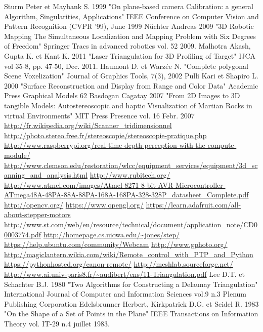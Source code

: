 \documentclass[a4paper,10pt]{report}
\begin{document}
\begin{thebibliography}{1}
 Sturm Peter et Maybank S. 1999 "On plane-based camera Calibration: a general Algorithm, Singularities, Applications" IEEE Conference on Computer Vision and Pattern Recognition (CVPR '99), June 1999
 Nüchter Andreas 2009 "3D Robotic Mapping The Simultaneous Localization and Mapping Problem with Six Degrees of Freedom" Springer Tracs in advanced robotics vol. 52 2009.
 Malhotra Akash, Gupta K. et Kant K. 2011 "Laser Triangulation for 3D Profiling of Target" IJCA vol 35-8, pp. 47-50, Dec. 2011.
 Haumont D. et Warzée N. "Complete polygonal Scene Voxelization" Journal of Graphics Tools, 7(3), 2002
 Pulli Kari et Shapiro L. 2000 "Surface Reconstruction and Display from Range and Color Data" Academic Press Graphical Models 62
 Basdogan Cagatay 2007 "From 2D Images to 3D tangible Models: Autostereoscopic and haptic Visualization of Martian Rocks in virtual Environments" MIT Press Presence vol. 16 Febr. 2007
 \url{http://fr.wikipedia.org/wiki/Scanner_tridimensionnel}
 \url{http://photo.stereo.free.fr/stereoscopie/stereoscopie-pratique.php}
 \url{http://www.raspberrypi.org/real-time-depth-perception-with-the-compute-module/}
 \url{http://www.clemson.edu/restoration/wlcc/equipment_services/equipment/3d_scanning_and_analysis.html}
 \url{http://www.rubitech.org/}
 \url{http://www.atmel.com/images/Atmel-8271-8-bit-AVR-Microcontroller-ATmega48A-48PA-88A-88PA-168A-168PA-328-328P_datasheet_Complete.pdf}
 \url{http://opencv.org/}
 \url{https://www.opengl.org/}
 \url{https://learn.adafruit.com/all-about-stepper-motors}
 \url{http://www.st.com/web/en/resource/technical/document/application_note/CD00003774.pdf}
 \url{http://homepage.cs.uiowa.edu/~jones/step/}
 \url{https://help.ubuntu.com/community/Webcam}
 \url{http://www.gphoto.org/}
 \url{http://magiclantern.wikia.com/wiki/Remote_control_with_PTP_and_Python}
 \url{https://pythonhosted.org/canon-remote/}
 \url{http://meshlab.sourceforge.net/}
 \url{http://www.ai.univ-paris8.fr/~audibert/ens/11-Triangulation.pdf}
 Lee D.T. et Schachter B.J. 1980 "Two Algorithms for Constructing a Delaunay Triangulation" International Journal of Computer and Information Sciences vol.9 n.3 Plenum Publishing Corporation
 Edelsbrunner Herbert, Kirkpatrick D.G. et Seidel R. 1983 "On the Shape of a Set of Points in the Plane" IEEE Transactions on Information Theory vol. IT-29 n.4 juillet 1983.

\end{thebibliography}
\end{document}
